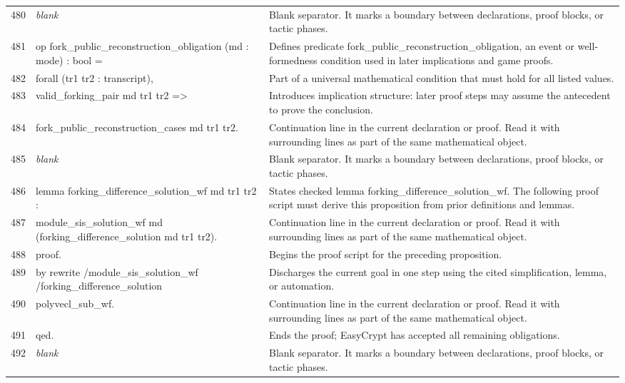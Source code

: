 \documentclass[10pt]{article}
\begin{document}
\begin{longtable}{r L{0.53\textwidth} L{0.37\textwidth}}
480 & {\ttfamily\scriptsize \emph{blank}} & Blank separator.  It marks a boundary between declarations, proof blocks, or tactic phases. \\
481 & {\ttfamily\scriptsize op fork\_public\_reconstruction\_obligation (md : mode) : bool =} & Defines predicate fork\_public\_reconstruction\_obligation, an event or well-formedness condition used in later implications and game proofs. \\
482 & {\ttfamily\scriptsize   forall (tr1 tr2 : transcript),} & Part of a universal mathematical condition that must hold for all listed values. \\
483 & {\ttfamily\scriptsize     valid\_forking\_pair md tr1 tr2 =>} & Introduces implication structure: later proof steps may assume the antecedent to prove the conclusion. \\
484 & {\ttfamily\scriptsize     fork\_public\_reconstruction\_cases md tr1 tr2.} & Continuation line in the current declaration or proof.  Read it with surrounding lines as part of the same mathematical object. \\
485 & {\ttfamily\scriptsize \emph{blank}} & Blank separator.  It marks a boundary between declarations, proof blocks, or tactic phases. \\
486 & {\ttfamily\scriptsize lemma forking\_difference\_solution\_wf md tr1 tr2 :} & States checked lemma forking\_difference\_solution\_wf.  The following proof script must derive this proposition from prior definitions and lemmas. \\
487 & {\ttfamily\scriptsize   module\_sis\_solution\_wf md (forking\_difference\_solution md tr1 tr2).} & Continuation line in the current declaration or proof.  Read it with surrounding lines as part of the same mathematical object. \\
488 & {\ttfamily\scriptsize proof.} & Begins the proof script for the preceding proposition. \\
489 & {\ttfamily\scriptsize by rewrite /module\_sis\_solution\_wf /forking\_difference\_solution} & Discharges the current goal in one step using the cited simplification, lemma, or automation. \\
490 & {\ttfamily\scriptsize            polyvecl\_sub\_wf.} & Continuation line in the current declaration or proof.  Read it with surrounding lines as part of the same mathematical object. \\
491 & {\ttfamily\scriptsize qed.} & Ends the proof; EasyCrypt has accepted all remaining obligations. \\
492 & {\ttfamily\scriptsize \emph{blank}} & Blank separator.  It marks a boundary between declarations, proof blocks, or tactic phases. \\

\end{longtable}
\end{document}
